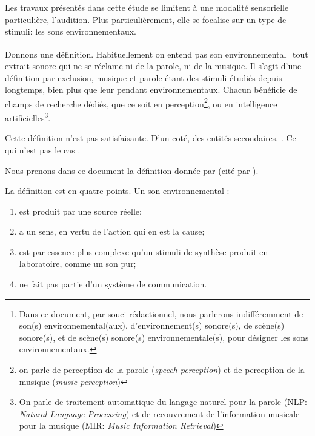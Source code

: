 Les travaux présentés dans cette étude se limitent à une modalité sensorielle particulière, l'audition. Plus particulièrement, elle se focalise sur un type de stimuli: les sons environnementaux. 

Donnons une définition. Habituellement on entend pas son environnemental\footnote{Dans ce document, par souci rédactionnel, nous parlerons indifféremment de son(s) environnemental(aux), d'environnement(s) sonore(s), de scène(s) sonore(s), et de scène(s) sonore(s) environnementale(s), pour désigner les sons environnementaux.} tout extrait sonore qui ne se réclame ni de la parole, ni de la musique. Il s'agit d'une définition par exclusion, musique et parole étant des stimuli étudiés depuis longtemps, bien plus que leur pendant environnementaux. Chacun bénéficie de champs de recherche dédiés, que ce soit en perception\footnote{on parle de perception de la parole (\emph{speech perception}) et de perception de la musique (\emph{music perception})}, ou en intelligence artificielles\footnote{On parle de traitement automatique du langage naturel pour la parole (NLP: \emph{Natural Language Processing}) et de recouvrement de l'information musicale pour la musique (MIR: \emph{Music Information Retrieval})}.

Cette définition  n'est pas satisfaisante. D'un coté,   des entités secondaires.  . Ce qui n'est pas le cas \citep{ballas1987interpreting}. 

Nous prenons dans ce document la définition donnée par \cite{vanderveer1980ecological} (cité par \cite{ballas1987interpreting}).

La définition est en quatre points. Un son environnemental :

\begin{enumerate}
\item est produit par une source réelle;
\item a un sens, en vertu de l'action qui en est la cause;
\item est par essence plus complexe qu'un stimuli de synthèse produit en laboratoire, comme un son pur;
\item ne fait pas partie d'un système de communication.
\end{enumerate} 

